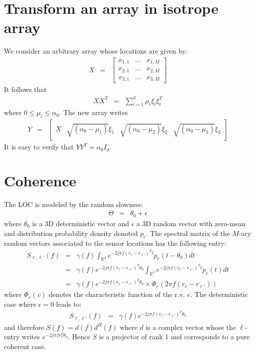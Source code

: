 \documentclass[a4paper, 12pt]{report}
\begin{document}
\appendix
\chapter{Transform an array in isotrope array}
We consider an arbitrary  array whose locations are given by:
\begin{eqnarray*}
X&=&\begin{bmatrix}
x_{1,1}&\ldots&x_{1,M}
\\
x_{2,1}&\ldots&x_{2,M}
\\
x_{3,1}&\ldots&x_{3,M}
\end{bmatrix}
\end{eqnarray*}
It follows that
\begin{eqnarray*}
 XX^{T}&=&
 \sum_{i=1}^{d}\mu_{i}\xi_{i}\xi^{T}_{i}
\end{eqnarray*}
where $0\leq \mu_{i}\leq \alpha_{0}$. The new array writes
\begin{eqnarray*}
Y &=& \begin{bmatrix}
X&\sqrt{(\alpha_{0}-\mu_{1})}\xi_{1}&\sqrt{(\alpha_{0}-\mu_{2})}\xi_{2}&\sqrt{(\alpha_{0}-\mu_{3})}\xi_{3}
\end{bmatrix}
\end{eqnarray*}
It is easy to verify that $YY^{T}=\alpha_{0}I_{d}$.

\chapter{Coherence}
The LOC is modeled by the random slowness:
\begin{eqnarray*}
\Theta &=& \theta_0+\epsilon
\end{eqnarray*}
where $\theta_0$ is a 3D deterministic vector and $\epsilon$ a 3D random vector with zero-mean and distribution probability density denoted $p_{\epsilon}$. The spectral matrix of the $M$-ary random vectors associated to the sensor locations has the following entry:
\begin{eqnarray*}
S_{\ell,\ell'}(f) &=& \gamma(f)\int_{\mathds{R}^3}e^{-2j\pi f (r_{\ell}-r_{\ell'})^Tt}p_{e}(t-\theta_0)dt
\\
&=&\gamma(f)
e^{-2j\pi f (r_{\ell}-r_{\ell'})^T\theta_0}
\int_{\mathds{R}^3}e^{-2j\pi f (r_{\ell}-r_{\ell'})^Tt}p_{e}(t)dt
\\
&=&\gamma(f)
e^{-2j\pi f (r_{\ell}-r_{\ell'})^T\theta_0}\times
\Phi_{e}(2\pi f(r_{\ell}-r_{\ell'}))
\end{eqnarray*}
where $\Phi_{e}(v)$ denotes the characteristic function of the r.v. $e$. The deterministic case where $\epsilon=0$ leads to:
\begin{eqnarray*}
S_{\ell,\ell'}(f) &=& \gamma(f)e^{-2j\pi f (r_{\ell}-r_{\ell'})^T\theta_0}
\end{eqnarray*}
and therefore $S(f)=d(f)d^H(f)$ where $d$ is a complex vector whose the $\ell$-entry writes $e^{-2j\pi f r_{\ell}^T\theta_0}$. Hence $S$ is a projector of rank 1 and corresponds to a pure coherent case.
\end{document}
